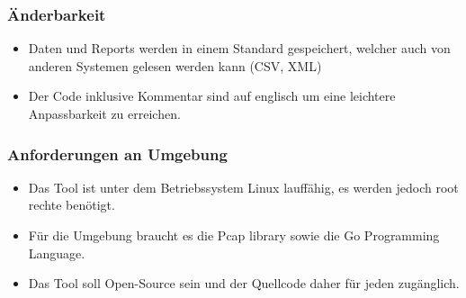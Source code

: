 \subsubsection{Änderbarkeit}
\begin{itemize}
\item Daten und Reports werden in einem Standard gespeichert, welcher auch von anderen Systemen gelesen werden kann (CSV, XML)
\item Der Code inklusive Kommentar sind auf englisch um eine leichtere Anpassbarkeit zu erreichen.
\end{itemize}

\subsubsection{Anforderungen an Umgebung}
\begin{itemize}
\item Das Tool ist unter dem Betriebssystem Linux lauffähig, es werden jedoch root rechte benötigt.
\item Für die Umgebung braucht es die Pcap library sowie die Go Programming Language.
\item Das Tool soll Open-Source sein und der Quellcode daher für jeden zugänglich.
\end{itemize}